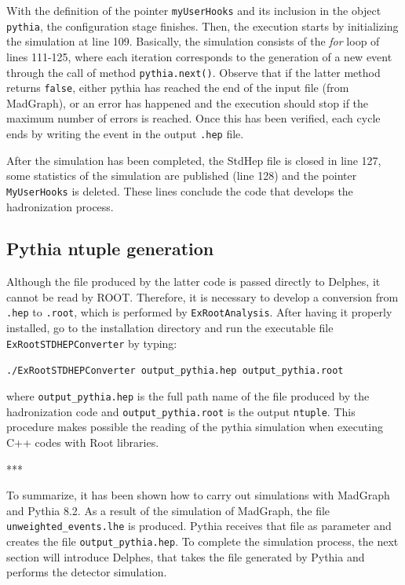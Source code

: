 \documentclass[12pt, oneside]{book}              %
\begin{document}
With the definition of the pointer \texttt{myUserHooks} and its inclusion in
the object \texttt{pythia}, the configuration stage finishes. Then, the execution
starts by initializing the simulation at line 109. Basically, the simulation consists
of the \textit{for} loop of lines 111-125, where each iteration corresponds to
the generation of a new event through the call of method \texttt{pythia.next()}.
Observe that if the latter method returns \texttt{false}, either pythia has reached the
end of the input file (from MadGraph), or an error has happened and the execution
should stop if the maximum number of errors is reached. Once this has been verified,
each cycle ends by writing the event in the output \texttt{.hep} file.

After the simulation has been completed, the StdHep file is closed 
in line 127, some statistics of the simulation are published (line 128) and the
pointer  \texttt{MyUserHooks} is deleted. These lines conclude the code that 
develops the hadronization process.

\subsection{Pythia ntuple generation} \label{sub:Pythia_ntuple}

Although the file produced by the latter code is passed directly to Delphes, it
cannot be read by ROOT. Therefore, it is necessary to develop a conversion
from \texttt{.hep} to \texttt{.root}, which is performed by \texttt{ExRootAnalysis}.
After having it properly installed, go to the installation directory and
run the executable file \texttt{ExRootSTDHEPConverter} by typing:

\texttt{./ExRootSTDHEPConverter output\_pythia.hep output\_pythia.root}

\noindent where \texttt{output\_pythia.hep} is the full path name of the
file produced by the hadronization code and \texttt{output\_pythia.root} is
the output \texttt{ntuple}. This procedure makes possible the reading of 
the pythia simulation when executing C++ codes with Root libraries.

\begin{center}
***
\end{center}

To summarize, it has been shown how to carry out simulations with MadGraph and
Pythia 8.2. As a result of the simulation of MadGraph, the file 
\texttt{unweighted\_events.lhe} is produced. Pythia receives that file as
parameter and creates the file \texttt{output\_pythia.hep}. To complete the 
simulation process, the next section will introduce Delphes, that takes the file
generated by Pythia and performs the detector simulation.
\end{document}

